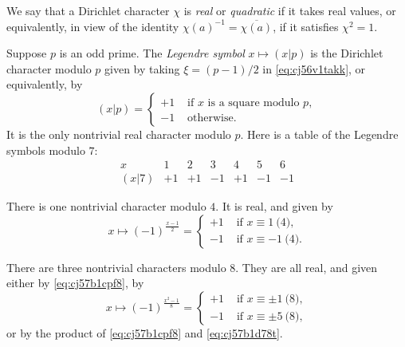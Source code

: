 \documentclass[reqno]{amsart}  \numberwithin{theorem}{section} \numberwithin{equation}{section}
\begin{document}
\begin{definition}\label{definition:cj57ckev22}
  We say that a Dirichlet character $\chi$ is \emph{real} or \emph{quadratic} if it takes real values, or equivalently, in view of the identity $\chi(a)^{-1} = \overline{\chi(a)}$, if it satisfies $\chi^2 = 1$.
\end{definition}
\begin{example}\label{example:cj57ckeu1v}
  Suppose $p$ is an odd prime.  The \emph{Legendre symbol} $x \mapsto (x | p)$ is the Dirichlet character modulo $p$ given by taking $\xi = (p-1)/2$ in \eqref{eq:cj56v1takk}, or equivalently, by
  \begin{equation*}
    (x|p) =
    \begin{cases}
      +1 & \text{ if } x \text{ is a square modulo } p, \\
      -1 & \text{ otherwise.}
    \end{cases}
  \end{equation*}
  It is the only nontrivial real character modulo $p$.  Here is a table of the Legendre symbols modulo $7$:
  \begin{equation*}
    \begin{array}{c|ccccccc}
      x & 1 & 2 & 3 & 4 & 5 & 6 \\
      \hline
      (x|7) & +1 & +1 & -1 & +1 & -1 & -1
    \end{array}  
  \end{equation*}
\end{example}
\begin{example}\label{example:cj57cket4w}
  There is one nontrivial character modulo $4$.  It is real, and given by
  \begin{equation}\label{eq:cj57b1cpf8}
    x \mapsto (-1)^{\frac{x-1}{2}}
    =
    \begin{cases}
      +1 & \text{ if } x \equiv 1 \pod{4}, \\
      -1 & \text{ if } x\equiv -1 \pod{4}.
    \end{cases}
  \end{equation}
\end{example}
\begin{example}\label{example:cj57ckes66}
  There are three nontrivial characters modulo $8$.  They are all real, and given either by \eqref{eq:cj57b1cpf8}, by
  \begin{equation}\label{eq:cj57b1d78t}
    x \mapsto (- 1 )^{\frac{x^2 - 1}{8}}
    =
    \begin{cases}
      +1 & \text{ if } x \equiv \pm 1 \pod{8}, \\
      -1 & \text{ if } x \equiv \pm 5 \pod{8},
    \end{cases}
  \end{equation}
  or by the product of \eqref{eq:cj57b1cpf8} and \eqref{eq:cj57b1d78t}.
\end{example}
\end{document}
